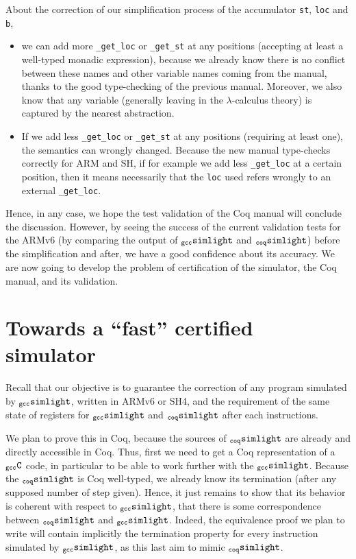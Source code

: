 \documentclass[a4paper, 11pt]{article}
\newcommand{\gccSL}{$_{\tt gcc}{\tt simlight}$\xspace}
\newcommand{\SL}{$_{\tt coq}{\tt simlight}$\xspace}
\newcommand{\gccC}{$_{\tt gcc}{\tt C}$\xspace}
\begin{document}
About the correction of our simplification process of the accumulator \verb|st|, \verb|loc| and \verb|b|, 
\begin{itemize}
\item we can add more \verb|_get_loc| or \verb|_get_st| at any positions (accepting at least a well-typed monadic expression), because we already know there is no conflict between these names and other variable names coming from the manual, thanks to the good type-checking of the previous manual. Moreover, we also know that any variable (generally leaving in the $\lambda$-calculus theory) is captured by the nearest abstraction.
\item If we add less \verb|_get_loc| or \verb|_get_st| at any positions (requiring at least one), the semantics can wrongly changed. Because the new manual type-checks correctly for ARM and SH, if for example we add less \verb|_get_loc| at a certain position, then it means necessarily that the \verb|loc| used refers wrongly to an external \verb|_get_loc|.
\end{itemize}
Hence, in any case, we hope the test validation of the Coq manual will conclude the discussion. However, by seeing the success of the current validation tests for the ARMv6 (by comparing the output of \gccSL and \SL) before the simplification and after, we have a good confidence about its accuracy. We are now going to develop the problem of certification of the simulator, the Coq manual, and its validation.
\section{Towards a ``fast'' certified simulator}
\label{s:fast_certi}

Recall that our objective is to guarantee the correction of any program simulated by \gccSL, written in ARMv6 or SH4, and the requirement of the same state of registers for \gccSL and \SL after each instructions. 

We plan to prove this in Coq, because the sources of \SL are already and directly accessible in Coq. Thus, first we need to get a Coq representation of a \gccC code, in particular to be able to work further with the \gccSL. 
Because the \SL is Coq well-typed, we already know its termination (after any supposed number of step given). Hence, it just remains to show that its behavior is coherent with respect to \gccSL, that there is some correspondence between \SL and \gccSL. Indeed, the equivalence proof we plan to write will contain implicitly the termination property for every instruction simulated by \gccSL, as this last aim to mimic \SL. 
\end{document}
